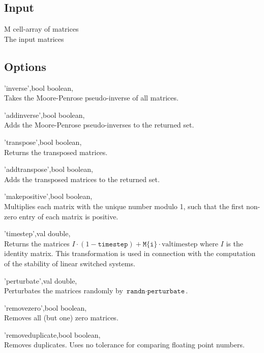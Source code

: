 \subsection*{Input}
\begin{param}
\item[M] cell-array of matrices\\The input matrices
\end{param}

\subsection*{Options}
\begin{param}
\item['inverse',bool] boolean, \\Takes the Moore-Penrose pseudo-inverse of all matrices.
\item['addinverse',bool] boolean, \\Adds the Moore-Penrose pseudo-inverses  to the returned set.
\item['transpose',bool] boolean, \\Returns the transposed matrices.
\item['addtranspose',bool] boolean, \\Adds the transposed matrices to the returned set.
\item['makepositive',bool] boolean, \\Multiplies each matrix with the unique number modulo 1, such that the first non-zero entry of each matrix is positive.
\item['timestep',val] double, \\Returns the matrices $I\cdot(1-\texttt{timestep}) + \texttt{M\{i\}}\cdot\text{valtimestep}$ 
where $I$ is the identity matrix. This transformation is used in connection with the computation of the stability of linear switched systems.
\item['perturbate',val] double, \\Perturbates the matrices randomly by $\texttt{randn}\cdot\texttt{perturbate}$.
\item['removezero',bool] boolean, \\Removes all (but one) zero matrices.
\item['removeduplicate,bool] boolean, \\Removes duplicates. Uses no tolerance for comparing floating point numbers.

\end{param}
